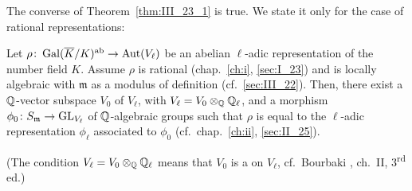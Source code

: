 The converse of Theorem~\ref{thm:III_23_1} is true. We state it only for the
case of rational representations:
\begin{thm}
	Let $\rho\colon \operatorname{Gal}(\overline{K}/K)^{\mathrm{ab}} \to \operatorname{Aut}(V_\ell)$ be an abelian
	$\ell$-adic representation of the number field $K$. Assume $\rho$ is
	rational (chap.~\ref{ch:i}, \ref{sec:I_23}) and is locally algebraic
	with $\mathfrak{m}$ as a modulus of definition (cf.\ \ref{sec:III_22}).
	Then, there exist a $\mathbb{Q}$-vector subspace $V_0$ of $V_\ell$, with
	$V_\ell = V_0 \otimes_{\mathbb{Q}} \mathbb{Q}_\ell$, and a morphism $\phi_0 \colon
	S_{\mathfrak{m}} \to \operatorname{GL}_{V_\ell}$ of $\mathbb{Q}$-algebraic groups such that
	$\rho$ is equal to the $\ell$-adic representation $\phi_\ell$
	associated to $\phi_0$ (cf.\ chap.~\ref{ch:ii}, \ref{sec:II_25}).
\end{thm}
(The condition $V_\ell = V_0 \otimes_{\mathbb{Q}} \mathbb{Q}_\ell$ means that $V_0$ is a
 on $V_\ell$, cf.\ Bourbaki \cite{bourbaki:alg},
ch.~II, 3\textsuperscript{rd} ed.)

